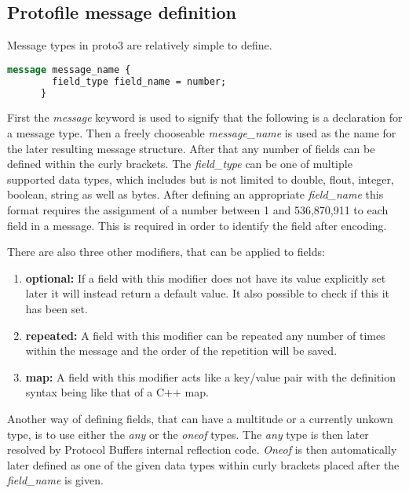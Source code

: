 \subsection{Protofile message definition}

Message types in proto3 are relatively simple to define.

\begin{minipage}{\textwidth}
\begin{lstlisting}[language=ProtoBuf, caption=Message definition syntax in Protofiles]
    message message_name {
        field_type field_name = number;
      }
\end{lstlisting}
\end{minipage}

First the \textit{message} keyword is used to signify that the following is a declaration for a message type. Then a freely chooseable \textit{message\_name} is 
used as the name for the later resulting message structure. After that any number of fields can be defined within the curly brackets. The \textit{field\_type} can be
one of multiple supported data types, which includes but is not limited to double, flout, integer, boolean, string as well as bytes. After defining an appropriate
\textit{field\_name} this format requires the assignment of a number between 1 and 536,870,911 to each field in a message. This is required in order to identify
the field after encoding.

There are also three other modifiers, that can be applied to fields:

\begin{enumerate}
    \item \textbf{optional:} If a field with this modifier does not have its value explicitly set later it will instead return a default value. It also possible to check if this it has been set.
    \item \textbf{repeated:} A field with this modifier can be repeated any number of times within the message and the order of the repetition will be saved.
    \item \textbf{map:} A field with this modifier acts like a key/value pair with the definition syntax being like that of a C++ map.
\end{enumerate}

Another way of defining fields, that can have a multitude or a currently unkown type, is to use either the \textit{any} or the \textit{oneof} types.
The \textit{any} type is then later resolved by Protocol Buffers internal reflection code.
\textit{Oneof} is then automatically later defined as one of the given data types within curly brackets placed after the \textit{field\_name} is given.

